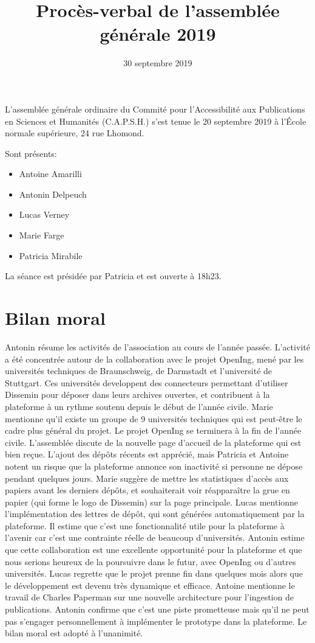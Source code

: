\documentclass[a4paper]{article}
\title{Procès-verbal de l'assemblée générale 2019}
\date{30 septembre 2019}
\begin{document}
\maketitle

L'assemblée générale ordinaire du Commité pour l'Accessibilité aux Publications en Sciences et Humanités (C.A.P.S.H.) s'est tenue le 20 septembre 2019 à l'École normale supérieure, 24 rue Lhomond.

Sont présents:
\begin{itemize}
  \item Antoine Amarilli
  \item Antonin Delpeuch
  \item Lucas Verney
  \item Marie Farge
  \item Patricia Mirabile
\end{itemize}

La séance est présidée par Patricia et est ouverte à 18h23.

\section{Bilan moral}

Antonin résume les activités de l'association au cours de l'année passée.
L'activité a été concentrée autour de la collaboration avec le projet OpenIng, mené
par les universités techniques de Braunschweig, de Darmstadt et l'université de 
Stuttgart. Ces universités developpent des connecteurs permettant d'utiliser
Dissemin pour déposer dans leurs archives ouvertes, et contribuent à la plateforme
à un rythme soutenu depuis le début de l'année civile.
Marie mentionne qu'il existe un groupe de 9 universités techniques qui est peut-être
le cadre plus général du projet.
Le projet OpenIng se terminera à la fin de l'année civile.
L'assemblée discute de la nouvelle page d'accueil de la plateforme qui est bien reçue.
L'ajout des dépôts récents est apprécié, mais Patricia et Antoine notent un risque 
que la plateforme annonce son inactivité si personne ne dépose pendant quelques jours.
Marie suggère de mettre les statistiques d'accès aux papiers avant les derniers dépôts, et
souhaiterait voir réapparaître la grue en papier (qui forme le logo de Dissemin) sur 
la page principale.
Lucas mentionne l'implémentation des lettres de dépôt, qui sont générées automatiquement
 par la plateforme. Il estime que c'est une fonctionnalité utile pour la plateforme à l'avenir car c'est une contrainte réelle de beaucoup d'universités.
Antonin estime que cette collaboration est une excellente opportunité pour la plateforme
et que nous serions heureux de la poursuivre dans le futur, avec OpenIng ou d'autres universités. Lucas regrette que le projet prenne fin dans quelques mois alors que le développement est devenu très dynamique et efficace.
Antoine mentionne le travail de Charles Paperman sur une nouvelle architecture pour l'ingestion de publications. Antonin confirme que c'est une piste prometteuse mais qu'il ne peut pas s'engager personnellement à implémenter le prototype dans la
plateforme.
Le bilan moral est adopté à l'unanimité.
\end{document}
